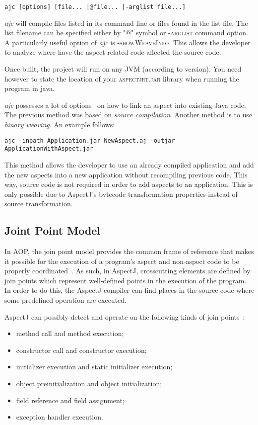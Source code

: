 \documentclass{template}
\begin{document}
\verb!ajc [options] [file... |@file... |-arglist file...]!

\textit{ajc} will compile files listed in its command line or files found in the list file. The list filename can be specified 
either by "@" symbol or \textsc{-arglist} command option. A particularly useful option of \textit{ajc} is \textsc{-showWeaveInfo}. This allows the developer to analyze where have the aspect related code affected the source code. 

Once built, the project will run on any JVM (according to version). You need however to state the location of your \textsc{aspectjrt.jar} library when running the program in java.

\textit{ajc} possesses a lot of options~\cite{ajcsite} on how to link an aspect into existing Java code. The previous method was based on \textit{source compilation}. Another method is to use \textit{binary weaving}. An example follows:

\verb!ajc -inpath Application.jar NewAspect.aj -outjar ApplicationWithAspect.jar!

This method allows the developer to use an already compiled application and add the new aspects into a new application without recompiling previous code. This way, source code is not required in order to add aspects to an application. This is only possible due to AspectJ's bytecode transformation properties instead of source transformation.

\subsection{Joint Point Model}

In AOP, the join point model provides the common frame of reference that makes it possible for the execution of a program's aspect and non-aspect code to be properly coordinated~\cite{Kiczales97aspect-orientedprogramming}. As such, in AspectJ, crosscutting elements are defined by join points which represent well-defined points in the execution of the program. In order to do this, the AspectJ compiler can find places in the source code where some predefined operation are executed. 

AspectJ can possibly detect and operate on the following kinds of join points~\cite{Kiselev2002}: 
\begin{itemize}
\item method call and method execution; 
\item constructor call and constructor execution; 
\item initializer execution and static initializer execution; 
\item object preinitialization and object initialization; 
\item field reference and field assignment; 
\item exception handler execution.
\end{itemize}
\end{document}
